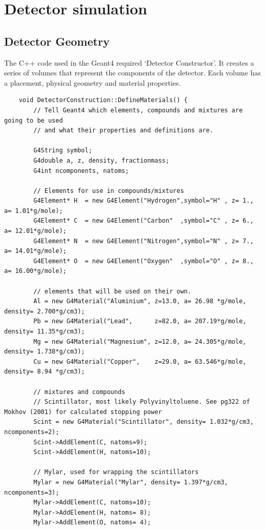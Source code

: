 \documentclass[]{article}
\begin{document}
\section{Detector simulation} %
\label{app:detector_simulation}
\subsection{Detector Geometry} %
\label{appsub:detector_geometry}
The C++ code used in the Geant4 required `Detector Constructor'. It creates a series of volumes that represent the components of the detector. Each volume has a placement, physical geometry and material properties.
 
\begin{verbatim}
    void DetectorConstruction::DefineMaterials() {
        // Tell Geant4 which elements, compounds and mixtures are going to be used
        // and what their properties and definitions are. 
        
        G4String symbol;        
        G4double a, z, density, fractionmass; 
        G4int ncomponents, natoms;
        
        // Elements for use in compounds/mixtures
        G4Element* H  = new G4Element("Hydrogen",symbol="H" , z= 1., a= 1.01*g/mole);
        G4Element* C  = new G4Element("Carbon"  ,symbol="C" , z= 6., a= 12.01*g/mole);
        G4Element* N  = new G4Element("Nitrogen",symbol="N" , z= 7., a= 14.01*g/mole);
        G4Element* O  = new G4Element("Oxygen"  ,symbol="O" , z= 8., a= 16.00*g/mole);
        
        // elements that will be used on their own.
        Al = new G4Material("Aluminium", z=13.0, a= 26.98 *g/mole, density= 2.700*g/cm3);
        Pb = new G4Material("Lead",      z=82.0, a= 207.19*g/mole, density= 11.35*g/cm3);
        Mg = new G4Material("Magnesium", z=12.0, a= 24.305*g/mole, density= 1.738*g/cm3);
        Cu = new G4Material("Copper",    z=29.0, a= 63.546*g/mole, density= 8.94 *g/cm3);
    
        // mixtures and compounds
        // Scintillator, most likely Polyvinyltoluene. See pg322 of Mokhov (2001) for calculated stopping power
        Scint = new G4Material("Scintillator", density= 1.032*g/cm3, ncomponents=2);
        Scint->AddElement(C, natoms=9);
        Scint->AddElement(H, natoms=10);
        
        // Mylar, used for wrapping the scintillators
        Mylar = new G4Material("Mylar", density= 1.397*g/cm3, ncomponents=3);
        Mylar->AddElement(C, natoms=10);
        Mylar->AddElement(H, natoms= 8);
        Mylar->AddElement(O, natoms= 4);
    

\end{verbatim}
\end{document}

